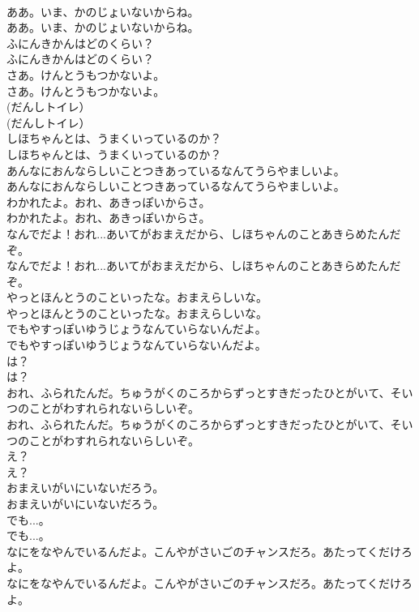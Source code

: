 \documentclass[8pt]{extreport}
\begin{document}
\begin{CJK}{UTF8}{min}
\\	ああ。いま、かのじょいないからね。
\\	ああ。いま、かのじょいないからね。
\\	ふにんきかんはどのくらい？
\\	ふにんきかんはどのくらい？
\\	さあ。けんとうもつかないよ。
\\	さあ。けんとうもつかないよ。
\\	(だんしトイレ）
\\	(だんしトイレ）
\\	しほちゃんとは、うまくいっているのか？
\\	しほちゃんとは、うまくいっているのか？
\\	あんなにおんならしいことつきあっているなんてうらやましいよ。
\\	あんなにおんならしいことつきあっているなんてうらやましいよ。
\\	わかれたよ。おれ、あきっぽいからさ。
\\	わかれたよ。おれ、あきっぽいからさ。
\\	なんでだよ！おれ...あいてがおまえだから、しほちゃんのことあきらめたんだぞ。
\\	なんでだよ！おれ...あいてがおまえだから、しほちゃんのことあきらめたんだぞ。
\\	やっとほんとうのこといったな。おまえらしいな。
\\	やっとほんとうのこといったな。おまえらしいな。
\\	でもやすっぽいゆうじょうなんていらないんだよ。
\\	でもやすっぽいゆうじょうなんていらないんだよ。
\\	は？
\\	は？
\\	おれ、ふられたんだ。ちゅうがくのころからずっとすきだったひとがいて、そいつのことがわすれられないらしいぞ。
\\	おれ、ふられたんだ。ちゅうがくのころからずっとすきだったひとがいて、そいつのことがわすれられないらしいぞ。
\\	え？
\\	え？
\\	おまえいがいにいないだろう。
\\	おまえいがいにいないだろう。
\\	でも...。
\\	でも...。
\\	なにをなやんでいるんだよ。こんやがさいごのチャンスだろ。あたってくだけろよ。
\\	なにをなやんでいるんだよ。こんやがさいごのチャンスだろ。あたってくだけろよ。

\end{CJK}
\end{document}
